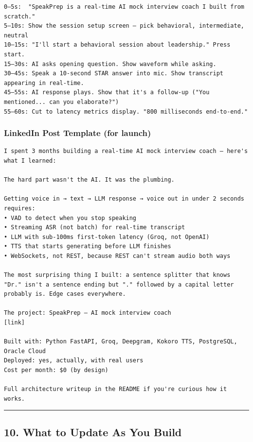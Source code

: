 \documentclass[
  11pt,
]{article}
\begin{document}
\begin{lstlisting}
0–5s:  "SpeakPrep is a real-time AI mock interview coach I built from scratch."
5–10s: Show the session setup screen — pick behavioral, intermediate, neutral
10–15s: "I'll start a behavioral session about leadership." Press start.
15–30s: AI asks opening question. Show waveform while asking.
30–45s: Speak a 10-second STAR answer into mic. Show transcript appearing in real-time.
45–55s: AI response plays. Show that it's a follow-up ("You mentioned... can you elaborate?")
55–60s: Cut to latency metrics display. "800 milliseconds end-to-end."
\end{lstlisting}

\hypertarget{linkedin-post-template-for-launch}{%
\subsubsection{LinkedIn Post Template (for
launch)}\label{linkedin-post-template-for-launch}}

\begin{lstlisting}
I spent 3 months building a real-time AI mock interview coach — here's what I learned:

The hard part wasn't the AI. It was the plumbing.

Getting voice in → text → LLM response → voice out in under 2 seconds requires:
• VAD to detect when you stop speaking
• Streaming ASR (not batch) for real-time transcript
• LLM with sub-100ms first-token latency (Groq, not OpenAI)
• TTS that starts generating before LLM finishes
• WebSockets, not REST, because REST can't stream audio both ways

The most surprising thing I built: a sentence splitter that knows "Dr." isn't a sentence ending but "." followed by a capital letter probably is. Edge cases everywhere.

The project: SpeakPrep — AI mock interview coach
[link]

Built with: Python FastAPI, Groq, Deepgram, Kokoro TTS, PostgreSQL, Oracle Cloud
Deployed: yes, actually, with real users
Cost per month: $0 (by design)

Full architecture writeup in the README if you're curious how it works.
\end{lstlisting}

\begin{center}\rule{0.5\linewidth}{0.5pt}\end{center}

\hypertarget{what-to-update-as-you-build}{%
\subsection{10. What to Update As You
Build}\label{what-to-update-as-you-build}}
\end{document}
